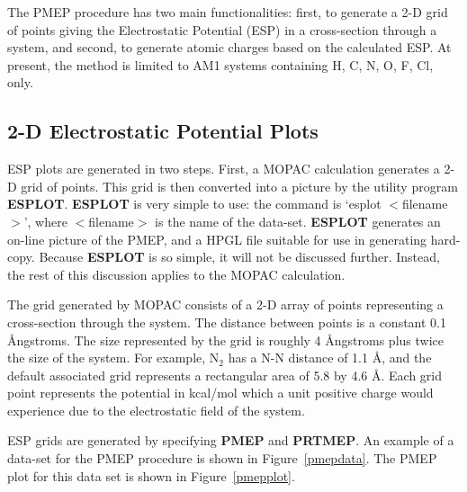 The PMEP procedure has two main functionalities: first, to generate a 2-D grid
of points giving the Electrostatic Potential (ESP) in a cross-section through
a system, and second, to generate atomic charges based on the calculated ESP.
 At present, the method is limited to AM1 systems containing
H, C, N, O, F, Cl, only. 

\subsection{2-D Electrostatic Potential Plots}

ESP plots are generated in two steps.  First, a MOPAC calculation generates
a 2-D grid of points.  This grid is then converted into a picture by the
utility program {\bf ESPLOT}.  {\bf ESPLOT} is very simple to use: the
command is `esplot $<$filename$>$', where $<$filename$>$ is the name of the
data-set.  {\bf ESPLOT} generates an on-line picture of the PMEP, and a HPGL
file suitable for use in generating hard-copy.  Because {\bf ESPLOT} is so
simple, it will not be discussed further.  Instead, the rest of this
discussion applies to the MOPAC calculation.

The grid generated by MOPAC consists of a 2-D array of points representing
a cross-section through the system.  The distance between points is a constant
0.1 \AA ngstroms.  The size represented by the grid is roughly 4 \AA ngstroms 
plus twice the size of the system.  For example, N$_2$ has a N-N distance
of 1.1 \AA , and the default associated grid represents a rectangular area of
5.8 by 4.6 \AA .    Each grid point represents the potential in kcal/mol which
a unit positive charge would experience due to the electrostatic field of
the system.

ESP grids are generated by specifying {\bf PMEP} and {\bf PRTMEP}. 
An example of a data-set for the PMEP procedure is shown in Figure~\ref{pmepdata}.
The PMEP plot for this data set is shown in Figure~\ref{pmepplot}.


